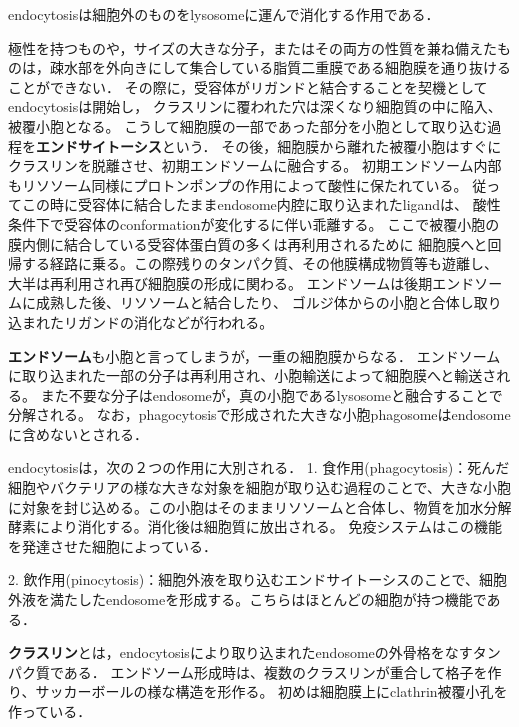 \documentclass[uplatex, dvipdfmx]{jsreport}
\begin{document}
endocytosisは細胞外のものをlysosomeに運んで消化する作用である．
\begin{definition}[endocytosis]
    極性を持つものや，サイズの大きな分子，またはその両方の性質を兼ね備えたものは，疎水部を外向きにして集合している脂質二重膜である細胞膜を通り抜けることができない．
    その際に，受容体がリガンドと結合することを契機としてendocytosisは開始し，
    クラスリンに覆われた穴は深くなり細胞質の中に陥入、被覆小胞となる。
    こうして細胞膜の一部であった部分を小胞として取り込む過程を\textbf{エンドサイトーシス}という．
    その後，細胞膜から離れた被覆小胞はすぐにクラスリンを脱離させ、初期エンドソームに融合する。
    初期エンドソーム内部もリソソーム同様にプロトンポンプの作用によって酸性に保たれている。
    従ってこの時に受容体に結合したままendosome内腔に取り込まれたligandは、
    酸性条件下で受容体のconformationが変化するに伴い乖離する。
    ここで被覆小胞の膜内側に結合している受容体蛋白質の多くは再利用されるために
    細胞膜へと回帰する経路に乗る。この際残りのタンパク質、その他膜構成物質等も遊離し、
    大半は再利用され再び細胞膜の形成に関わる。
    エンドソームは後期エンドソームに成熟した後、リソソームと結合したり、
    ゴルジ体からの小胞と合体し取り込まれたリガンドの消化などが行われる。
\end{definition}
\begin{definition}[endosome]
    \textbf{エンドソーム}も小胞と言ってしまうが，一重の細胞膜からなる．
    エンドソームに取り込まれた一部の分子は再利用され、小胞輸送によって細胞膜へと輸送される。
    また不要な分子はendosomeが，真の小胞であるlysosomeと融合することで分解される。
    なお，phagocytosisで形成された大きな小胞phagosomeはendosomeに含めないとされる．
\end{definition}
\begin{definition}
    endocytosisは，次の２つの作用に大別される．
        1. 食作用(phagocytosis)：死んだ細胞やバクテリアの様な大きな対象を細胞が取り込む過程のことで、大きな小胞に対象を封じ込める。この小胞はそのままリソソームと合体し、物質を加水分解酵素により消化する。消化後は細胞質に放出される。
        免疫システムはこの機能を発達させた細胞によっている．

        2. 飲作用(pinocytosis)：細胞外液を取り込むエンドサイトーシスのことで、細胞外液を満たしたendosomeを形成する。こちらはほとんどの細胞が持つ機能である．
\end{definition}

\begin{definition}[clathrin]
    \textbf{クラスリン}とは，endocytosisにより取り込まれたendosomeの外骨格をなすタンパク質である．
    エンドソーム形成時は、複数のクラスリンが重合して格子を作り、サッカーボールの様な構造を形作る。
    初めは細胞膜上にclathrin被覆小孔を作っている．
\end{definition}
\end{document}
